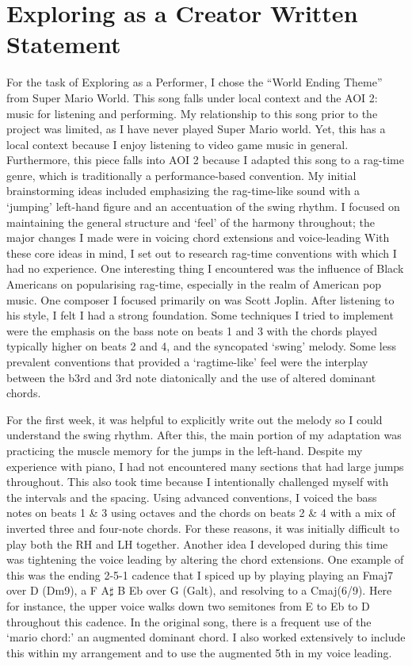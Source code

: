 \documentclass[11pt,a4paper]{article}
\begin{document}
\section{Exploring as a Creator Written Statement}

For the task of Exploring as a Performer, I chose the “World Ending Theme” from Super Mario World. This song falls under local context and the AOI 2: music for listening and performing. My relationship to this song prior to the project was limited, as I have never played Super Mario world. Yet, this has a local context because I enjoy listening to video game music in general. Furthermore, this piece falls into AOI 2 because I adapted this song to a rag-time genre, which is traditionally a performance-based convention. 
My initial brainstorming ideas included emphasizing the rag-time-like sound with a ‘jumping’ left-hand figure and an accentuation of the swing rhythm. I focused on maintaining the general structure and ‘feel’ of the harmony throughout; the major changes I made were in voicing chord extensions and voice-leading With these core ideas in mind, I set out to research rag-time conventions with which I had no experience. One interesting thing I encountered was the influence of Black Americans on popularising rag-time, especially in the realm of American pop music. One composer I focused primarily on was Scott Joplin. After listening to his style, I felt I had a strong foundation. Some techniques I tried to implement were the emphasis on the bass note on beats 1 and 3 with the chords played typically higher on beats 2 and 4, and the syncopated ‘swing’ melody. Some less prevalent conventions that provided a ‘ragtime-like’ feel were the interplay between the b3rd and 3rd note diatonically and the use of altered dominant chords.
 
For the first week, it was helpful to explicitly write out the melody so I could understand the swing rhythm. After this, the main portion of my adaptation was practicing the muscle memory for the jumps in the left-hand. Despite my experience with piano, I had not encountered many sections that had large jumps throughout. This also took time because I intentionally challenged myself with the intervals and the spacing. Using advanced conventions, I voiced the bass notes on beats 1 \& 3 using octaves and the chords on beats 2 \& 4 with a mix of inverted three and four-note chords. For these reasons, it was initially difficult to play both the RH and LH together. Another idea I developed during this time was tightening the voice leading by altering the chord extensions. One example of this was the ending 2-5-1 cadence that I spiced up by playing playing an Fmaj7 over D (Dm9), a F A$\sharp$ B Eb over G (Galt), and resolving to a Cmaj(6/9). Here for instance, the upper voice walks down two semitones from E to Eb to D throughout this cadence. In the original song, there is a frequent use of the ‘mario chord:’ an augmented dominant chord. I also worked extensively to include this within my arrangement and to use the augmented 5th in my voice leading.
 
\end{document}
